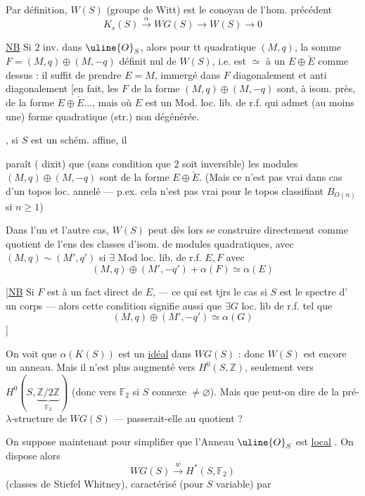 Par définition, $W(S)$ (groupe de Witt) est le conoyau
de l'hom. précédent
\[
K_s(S)\xrightarrow{\alpha}WG(S)\longrightarrow W(S)\longrightarrow0
\]

\uline{NB} Si $2$ inv. dans $\uline{O}_S$, alors pour tt  quadratique
$(M,q)$, la somme $F=(M,q)\oplus(M,-q)$ définit  
nul de $W(S)$, i.e. est $\simeq$ à un $E\oplus\check E$ comme
dessus : il suffit de prendre $E=M$, immergé
dans $F$ diagonalement et anti diagonalement
[en fait, les  $F$ de la forme $(M,q)\oplus(M,-q)$ sont,
à isom. près,  de la forme $E\oplus\check E$...,
mais où $E$ est un Mod. loc. lib. de r.f.
qui admet (au moins une) forme quadratique
(str.) non dégénérée.

, si $S$ est un schém. affine, il

paraît ( dixit) que (sans condition que
$2$ soit inversible) les modules $(M,q)\oplus(M,-q)$
sont de la forme  $E\oplus\check E$. (Mais ce n'est pas
vrai dans   cas d'un topos loc. annelé —
p.ex. cela n'est pas vrai pour le topos classifiant
$B_{O(n)}$ si $n\ge1$)

Dans l'un et l'autre cas, $W(S)$ peut
dès lors se construire directement comme
quotient de l'ens des classes d'isom.
de modules quadratiques, avec
$(M,q)\sim(M',q')$ si 
 
$\exists$ Mod loc. lib. de r.f. $E,F$ avec
\[
(M,q)\oplus(M',-q')+\alpha(F)\simeq\alpha(E)
\]

[\uline{NB} Si $F$ est  à un fact direct de $E$,
— ce qui est tjrs le cas si $S$ est le spectre d'
un corps —  alors cette condition signifie
aussi que $\exists G$ loc. lib de r.f. tel que
\[
(M,q)\oplus(M',-q')\simeq\alpha(G)
\]
]

On voit que $\alpha(K(S))$ est un \uline{idéal} dans
$WG(S)$ : donc $W(S)$ est encore un anneau.
Mais il n'est plus augmenté vers $H^0(S,\mathbb Z)$,
seulement vers $H^0(S,\underbrace{\mathbb Z/2\mathbb Z}_{\mathbb F_2})$ (donc vers
$\mathbb F_2$ si $S$ connexe $\ne\varnothing$). Mais que peut-on
dire de la pré-$\lambda$-structure de $WG(S)$
— passerait-elle au quotient ?

On suppose maintenant pour simplifier que
l'Anneau $\uline{O}_S$ est  \uline{local}
. On dispose alors
\[
WG(S)\xrightarrow{w}H^*(S,\mathbb F_2)
\]
(classes de Stiefel Whitney), caractérisé (pour
$S$ variable) par

